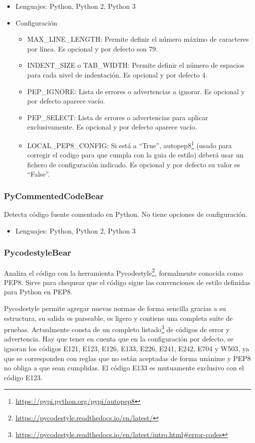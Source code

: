 \documentclass[a4paper, 12pt]{book}
\begin{document}
\begin{itemize}
  \item Lenguajes: Python, Python 2, Python 3
  \item Configuración
    \begin{itemize}
          \item MAX\_LINE\_LENGTH: Permite definir el número máximo de caracteres por línea. Es opcional y por defecto son 79.
          \item INDENT\_SIZE o TAB\_WIDTH: Permite definir el número de espacios para cada nivel de indentación. Es opcional y por defecto 4.
          \item PEP\_IGNORE: Lista de errores o advertencias a ignorar. Es opcional y por defecto aparece vacío.
          \item PEP\_SELECT: Lista de errores o advertencias para aplicar exclusivamente. Es opcional y por defecto aparece vacío.
          \item LOCAL\_PEP8\_CONFIG: Si está a “True”, autopep8\footnote{\url{https://pypi.python.org/pypi/autopep8}} (usado para corregir el codigo para que cumpla con la guia de estilo) deberá usar un fichero de configuración indicado. Es opcional y por defecto su valor es “False”.
    \end{itemize}
\end{itemize}

\subsubsection{PyCommentedCodeBear}
\label{sec:seccion1.2.6}
Detecta código fuente comentado en Python. No tiene opciones de configuración.

\begin{itemize}
  \item Lenguajes: Python, Python 2, Python 3
\end{itemize}

\subsubsection{PycodestyleBear}
\label{sec:seccion1.2.7}
Analiza el código con la herramienta Pycodestyle\footnote{\url{https://pycodestyle.readthedocs.io/en/latest/}}, formalmente conocida como PEP8. Sirve para chequear que el código sigue las convenciones de estilo definidas para Python en PEP8.

Pycodestyle permite agregar nuevas normas de forma sencilla gracias a su estructura, su salida es parseable, es ligero y contiene una completa suite de pruebas. Actualmente consta de un completo listado\footnote{\url{https://pycodestyle.readthedocs.io/en/latest/intro.html#error-codes}} de códigos de error y advertencia. Hay que tener en cuenta que en la configuración por defecto, se ignoran los códigos E121, E123, E126, E133, E226, E241, E242, E704 y W503, ya que se corresponden con reglas que no están aceptadas de forma unánime y PEP8 no obliga a que sean cumplidas. El código E133 es mutuamente exclusivo con el código E123.
\end{document}
